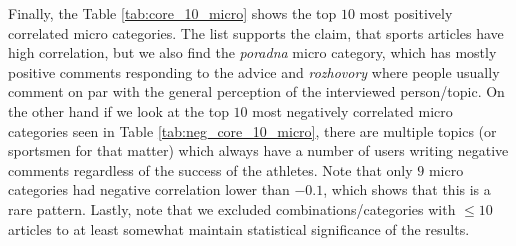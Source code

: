 \documentclass[11pt,a4paper]{article}
\begin{document}
Finally, the Table \ref{tab:core_10_micro} shows the top $10$ most positively correlated micro categories. The list supports the claim, that sports articles have high correlation, but we also find the \textit{poradna} micro category, which has mostly positive comments responding to the advice and \textit{rozhovory} where people usually comment on par with the general perception of the interviewed person/topic. On the other hand if we look at the top $10$ most negatively correlated micro categories seen in Table \ref{tab:neg_core_10_micro}, there are multiple topics (or sportsmen for that matter) which always have a number of users writing negative comments regardless of the success of the athletes. Note that only $9$ micro categories had negative correlation lower than $-0.1$, which shows that this is a rare pattern. Lastly, note that we excluded combinations/categories with $\leq 10$ articles to at least somewhat maintain statistical significance of the results.
\end{document}
